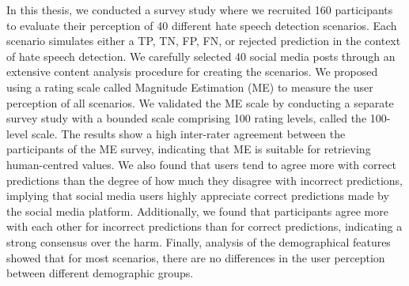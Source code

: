 %
In this thesis, we conducted a survey study where we recruited 160 participants to evaluate their perception of 40 different hate speech detection scenarios.
%
Each scenario simulates either a TP, TN, FP, FN, or rejected prediction in the context of hate speech detection.
%
We carefully selected 40 social media posts through an extensive content analysis procedure for creating the scenarios.
%
We proposed using a rating scale called Magnitude Estimation (ME) to measure the user perception of all scenarios.
%
We validated the ME scale by conducting a separate survey study with a bounded scale comprising 100 rating levels, called the 100-level scale.
%
The results show a high inter-rater agreement between the participants of the ME survey, indicating that ME is suitable for retrieving human-centred values.
%
We also found that users tend to agree more with correct predictions than the degree of how much they disagree with incorrect predictions, implying that social media users highly appreciate correct predictions made by the social media platform.
%
Additionally, we found that participants agree more with each other for incorrect predictions than for correct predictions, indicating a strong consensus over the harm.
%
Finally, analysis of the demographical features showed that for most scenarios, there are no differences in the user perception between different demographic groups.
%

